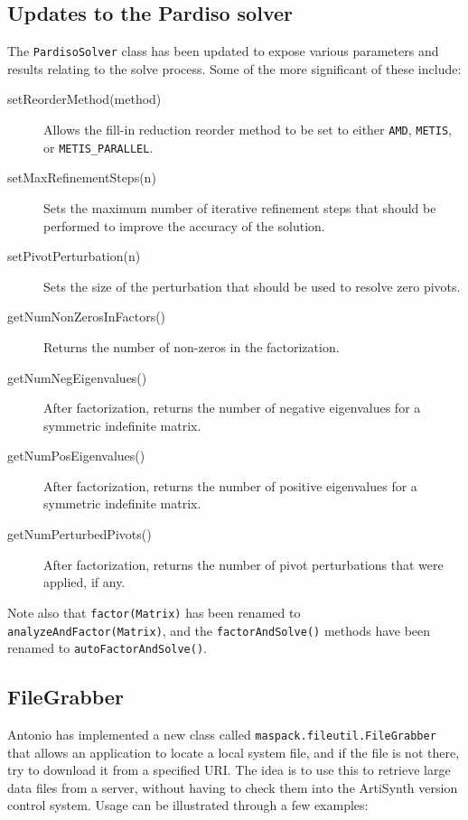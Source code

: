 \documentclass{article}
\begin{document}
\subsection*{Updates to the Pardiso solver}

The {\tt PardisoSolver} class has been updated to expose various
parameters and results relating to the solve process. Some of the more
significant of these include:

\begin{description}

\item[setReorderMethod(method)] \mbox{}
Allows the fill-in
reduction reorder method to be set to either
{\tt AMD}, {\tt METIS}, or {\tt METIS\_PARALLEL}.

\item[setMaxRefinementSteps(n)] \mbox{}
Sets the maximum number
of iterative refinement steps that should be performed to improve
the accuracy of the solution.

\item[setPivotPerturbation(n)] \mbox{} Sets the size
of the perturbation that should be used to resolve zero pivots.

\item[getNumNonZerosInFactors()] \mbox{}
Returns the number of non-zeros in the factorization.

\item[getNumNegEigenvalues()] \mbox{}
After factorization, returns the number of negative eigenvalues
for a symmetric indefinite matrix.

\item[getNumPosEigenvalues()] \mbox{}
After factorization, returns the number of positive eigenvalues
for a symmetric indefinite matrix.

\item[getNumPerturbedPivots()] \mbox{}
After factorization, returns the number of pivot perturbations 
that were applied, if any.

\end{description}

Note also that {\tt factor(Matrix)} has been renamed to {\tt
analyzeAndFactor(Matrix)}, and the {\tt factorAndSolve()}
methods have been renamed to {\tt autoFactorAndSolve()}.

\subsection*{FileGrabber}

Antonio has implemented a new class called {\tt maspack.fileutil.FileGrabber}
that allows an application to locate a local system
file, and if the file is not there, try to download it from a
specified URI. The idea is to use this to retrieve large data files
from a server, without having to check them into the ArtiSynth version
control system. Usage can be illustrated through a few examples:
\end{document}
